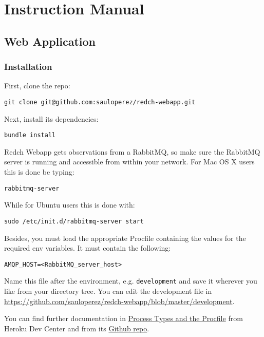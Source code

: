 \chapter{Instruction Manual}

\section{Web Application}\label{doc-webapp}

\subsection*{Installation}\label{installation}

First, clone the repo:

\begin{verbatim}
git clone git@github.com:sauloperez/redch-webapp.git
\end{verbatim}

Next, install its dependencies:

\begin{verbatim}
bundle install
\end{verbatim}

Redch Webapp gets observations from a RabbitMQ, so make sure the
RabbitMQ server is running and accessible from within your network. For
Mac OS X users this is done be typing:

\begin{verbatim}
rabbitmq-server
\end{verbatim}

While for Ubuntu users this is done with:

\begin{verbatim}
sudo /etc/init.d/rabbitmq-server start
\end{verbatim}

Besides, you must load the appropriate Procfile containing the values
for the required env variables. It must contain the following:

\begin{verbatim}
AMQP_HOST=<RabbitMQ_server_host>
\end{verbatim}

Name this file after the environment, e.g. \texttt{development} and save
it wherever you like from your directory tree. You can edit the
development file in
\url{https://github.com/sauloperez/redch-webapp/blob/master/development}.

You can find further documentation in
\href{https://devcenter.heroku.com/articles/procfile\#developing-locally-with-foreman}{Process
Types and the Procfile} from Heroku Dev Center and from its
\href{https://github.com/ddollar/foreman}{Github repo}.

